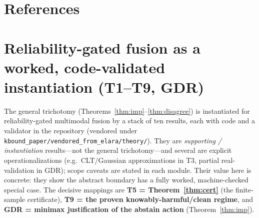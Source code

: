 \documentclass[11pt]{article}
\theoremstyle{plain}
\theoremstyle{definition}
\begin{document}
\section*{References}
\small
{}

\appendix
\section{Reliability-gated fusion as a worked, code-validated instantiation (T1--T9, GDR)}
\label{app:stack}
The general trichotomy (Theorems~\ref{thm:imp}--\ref{thm:disagree}) is instantiated for
reliability-gated multimodal fusion by a stack of ten results, each with code and a
validator in the repository (vendored under
\texttt{kbound\_paper/vendored\_from\_elara/theory/}). They are \emph{supporting /
instantiation} results---not the general trichotomy---and several are explicit
operationalizations (e.g.\ CLT/Gaussian approximations in T3, partial real-validation in
GDR); scope caveats are stated in each module. Their value here is concrete: they show
the abstract boundary has a fully worked, machine-checked special case. The decisive
mappings are \textbf{T5 = Theorem~\ref{thm:cert}} (the finite-sample certificate),
\textbf{T9 = the proven knowably-harmful/clean regime}, and \textbf{GDR = minimax
justification of the abstain action} (Theorem~\ref{thm:imp}).
\end{document}
